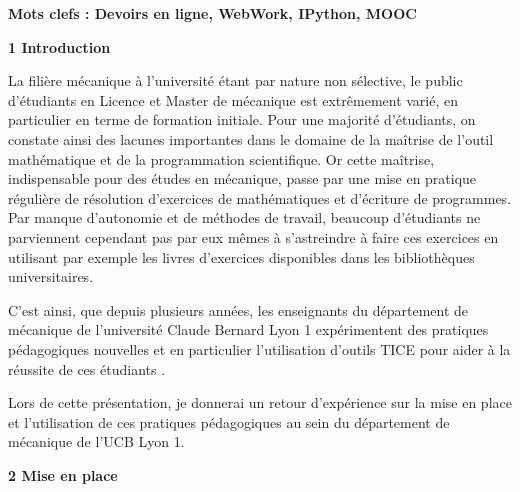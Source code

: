 \documentclass[12pt,oneside,french]{article}
\begin{document}
\vspace{27pt}
{\large{}\textbf{Mots clefs : Devoirs en ligne, WebWork, IPython, MOOC}}

\vspace{13pt}
{\Large{}\textbf{1 Introduction}}
\vspace{13pt}

La filière mécanique à l'université étant par nature non sélective, le public
d'étudiants en Licence et Master de mécanique est extrêmement varié, en
particulier en terme de formation initiale. Pour une majorité d'étudiants, on
constate ainsi des lacunes importantes dans le domaine de la maîtrise de
l'outil mathématique et de la programmation scientifique.  Or cette maîtrise,
indispensable pour des études en mécanique,  passe par une mise en pratique
régulière de résolution d'exercices de mathématiques et d'écriture de
programmes. Par manque d'autonomie et de méthodes de travail, beaucoup
d'étudiants ne parviennent cependant pas par eux mêmes à s'astreindre à faire ces
exercices en utilisant par exemple les livres d'exercices disponibles dans les bibliothèques
universitaires.

C'est ainsi, que depuis plusieurs années, les enseignants du département de
mécanique de l'université Claude Bernard Lyon 1 expérimentent des pratiques
pédagogiques nouvelles et en particulier l'utilisation d'outils TICE pour aider
à la réussite de ces étudiants \cite{buffat1,buffat2,buffat3}. 

Lors de cette présentation, je donnerai un retour d'expérience sur la mise en place
et l'utilisation de ces pratiques pédagogiques au sein du département de mécanique de l'UCB Lyon 1.

\vspace{13pt}
{\Large{}\textbf{2 Mise en place}}
\vspace{13pt}
\end{document}
